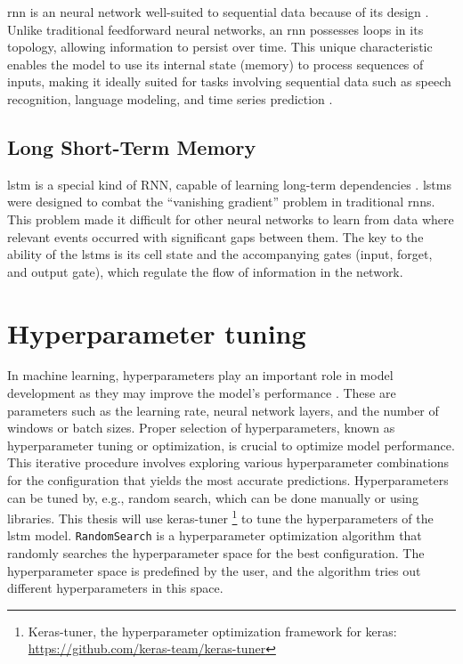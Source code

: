 \ac{rnn} is an neural network well-suited to sequential data because of its design \cite{hopfield-rnn}.
Unlike traditional feedforward neural networks, an \ac{rnn} possesses loops in its topology, allowing information to persist over time.
This unique characteristic enables the model to use its internal state (memory) to process sequences of inputs, making it ideally suited for tasks involving sequential data such as speech recognition, language modeling, and time series prediction \cite{elman_finding_1990}.

\subsection{Long Short-Term Memory}

\ac{lstm} is a special kind of RNN, capable of learning long-term dependencies \cite{lstm-hochreiter}.
\acp{lstm} were designed to combat the ``vanishing gradient'' problem in traditional \acp{rnn}. 
This problem made it difficult for other neural networks to learn from data where relevant events occurred with significant gaps between them.
The key to the ability of the \acp{lstm} is its cell state and the accompanying gates (input, forget, and output gate), which regulate the flow of information in the network.

\section{Hyperparameter tuning}\label{sec:hyperparameter-tuning}

In machine learning, hyperparameters play an important role in model development as they may improve the model's performance \cite{yuHyperParameterOptimizationReview2020}.
These are parameters such as the learning rate, neural network layers, and the number of windows or batch sizes.
Proper selection of hyperparameters, known as hyperparameter tuning or optimization, is crucial to optimize model performance.
This iterative procedure involves exploring various hyperparameter combinations for the configuration that yields the most accurate predictions.
Hyperparameters can be tuned by, e.g., random search, which can be done manually or using libraries.
This thesis will use keras-tuner \footnote{Keras-tuner, the hyperparameter optimization framework for keras: \url{https://github.com/keras-team/keras-tuner}} to tune the hyperparameters of the \ac{lstm} model.
\texttt{RandomSearch} is a hyperparameter optimization algorithm that randomly searches the hyperparameter space for the best configuration.
The hyperparameter space is predefined by the user, and the algorithm tries out different hyperparameters in this space.
